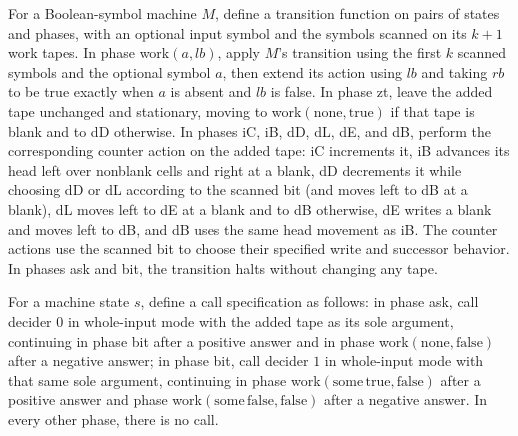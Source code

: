 \begin{definition}
\label{Complexity.LogProg.OIS.tr}
\leanok
{}
For a Boolean-symbol machine $M$, define a transition function on pairs of states and
phases, with an optional input symbol and the symbols scanned on its $k+1$ work tapes.
In phase work$(a,lb)$, apply $M$'s transition using the first $k$ scanned symbols and
the optional symbol $a$, then extend its action using $lb$ and taking $rb$ to be true
exactly when $a$ is absent and $lb$ is false. In phase zt, leave the added tape
unchanged and stationary, moving to work$(\mathrm{none},\mathrm{true})$ if that tape
is blank and to dD otherwise. In phases iC, iB, dD, dL, dE, and dB, perform the
corresponding counter action on the added tape: iC increments it, iB advances its head
left over nonblank cells and right at a blank, dD decrements it while choosing dD or dL
according to the scanned bit (and moves left to dB at a blank), dL moves left to dE at a
blank and to dB otherwise, dE writes a blank and moves left to dB, and dB uses the same
head movement as iB. The counter actions use the scanned bit to choose their specified
write and successor behavior. In phases ask and bit, the transition halts without
changing any tape.
\end{definition}

\begin{definition}
\label{Complexity.LogProg.OIS.call}
\leanok
{}
For a machine state $s$, define a call specification as follows: in phase ask, call
decider $0$ in whole-input mode with the added tape as its sole argument, continuing in
phase bit after a positive answer and in phase work$(\mathrm{none},\mathrm{false})$
after a negative answer; in phase bit, call decider $1$ in whole-input mode with that
same sole argument, continuing in phase
work$(\mathrm{some}\,\mathrm{true},\mathrm{false})$ after a positive answer and
phase work$(\mathrm{some}\,\mathrm{false},\mathrm{false})$ after a negative answer.
In every other phase, there is no call.
\end{definition}

